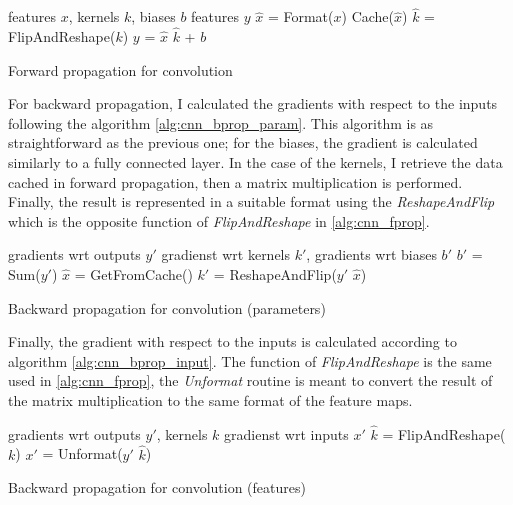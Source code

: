 \documentclass{article}
\begin{document}
\begin{algorithm}[ht]
\begin{algorithmic}
    features $x$, kernels $k$, biases $b$
    features $y$
   \STATE $\hat{x}$ = Format($x$)
   \STATE Cache($\hat{x}$)
   \STATE $\hat{k}$ = FlipAndReshape($k$)
   \STATE $y$ = $\hat{x}$ $\hat{k}$ + $b$
   \ENDIF
\end{algorithmic}
  \caption{Forward propagation for convolution}
  \label{alg:cnn_fprop}
\end{algorithm}

For backward propagation, I calculated the gradients with respect to the inputs following the algorithm \ref{alg:cnn_bprop_param}. This algorithm is as straightforward as the previous one; for the biases, the gradient is calculated similarly to a fully connected layer. In the case of the kernels, I retrieve the data cached in forward propagation, then a matrix multiplication is performed. Finally, the result is represented in a suitable format using the \textit{ReshapeAndFlip} which is the opposite function of \textit{FlipAndReshape} in \ref{alg:cnn_fprop}.

\begin{algorithm}[ht]
\begin{algorithmic}
    gradients wrt outputs $y'$
    gradienst wrt kernels $k'$, gradients wrt biases $b'$
   \STATE $b'$ = Sum($y'$)
   \STATE $\hat{x}$ = GetFromCache()
   \STATE $k'$ = ReshapeAndFlip($y'$ $\hat{x}$)
\end{algorithmic}
  \caption{Backward propagation for convolution (parameters)}
  \label{alg:cnn_bprop_param}
\end{algorithm}

Finally, the gradient with respect to the inputs is calculated according to algorithm \ref{alg:cnn_bprop_input}. The function of \textit{FlipAndReshape} is the same used in \ref{alg:cnn_fprop}, the \textit{Unformat} routine is meant to convert the result of the matrix multiplication to the same format of the feature maps.

\begin{algorithm}[ht]
\begin{algorithmic}
    gradients wrt outputs $y'$, kernels $k$
    gradienst wrt inputs $x'$
   \STATE $\hat{k}$ = FlipAndReshape($k$)
   \STATE $x'$ = Unformat($y'$ $\hat{k}$)
\end{algorithmic}
  \caption{Backward propagation for convolution (features)}
  \label{alg:cnn_bprop_input}
\end{algorithm}
\end{document}
